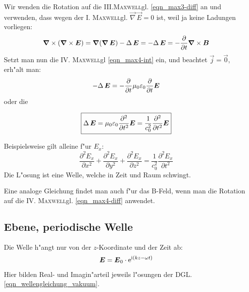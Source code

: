 Wir wenden die Rotation auf die
III.\textsc{Maxwell}gl. \eqref{eqn_max3-diff} an und verwenden, dass
wegen der I. \textsc{Maxwell}gl. $\vec\nabla\, \vec E = 0$ ist, weil
ja keine Ladungen vorliegen:
\begin{equation}
   \label{eq:401}
   \boldsymbol{\nabla}\times (\boldsymbol{\nabla}\times \boldsymbol{E}) =
\boldsymbol{\nabla}(\boldsymbol{\nabla}\, \boldsymbol{E}) - \Delta \,{\boldsymbol{E}} = -\Delta \,{\boldsymbol{E}}
=
-\frac{\partial }{\partial t} \boldsymbol{\nabla}\times \boldsymbol{B}
\end{equation}
Setzt man nun die IV. \textsc{Maxwell}gl \eqref{eqn_max4-int} ein,
und beachtet $\vec j = \vec 0$, erh"alt man:
\begin{equation*}
   \label{eq:402}
   -\Delta \, \boldsymbol{E} = -\frac{\partial }{\partial t} \mu_0\varepsilon_0
   \frac{\partial }{\partial t} \boldsymbol{E}
\end{equation*}
oder die
\begin{Wichtig}
\begin{equation}
   \label{eqn_wellengleichung_vakuum}
   \boxed{ \Delta \, \boldsymbol{E} = \mu_0\varepsilon_0 \frac{\partial^2
     }{\partial t^2} \boldsymbol{E} = \frac{1}{c_0^2} \frac{\partial
       ^2}{\partial t^2}\boldsymbol{E}}
\end{equation}
\end{Wichtig}

Beispielsweise gilt alleine f"ur $E_x$:
\begin{equation*}
   \frac{\partial^2 E_x}{\partial x^2}
+    \frac{\partial^2 E_x}{\partial y^2}
+    \frac{\partial^2 E_x}{\partial z^2}
=
\frac{1}{c_0^2} \frac{\partial ^2 E_x}{\partial t^2}
\end{equation*}
Die L"osung ist eine Welle, welche in Zeit und Raum schwingt.

Eine analoge Gleichung findet man auch f"ur das B-Feld, wenn man die
Rotation auf die IV. \textsc{Maxwell}gl. \eqref{eqn_max4-diff} anwendet.





\subsection{Ebene, periodische Welle}
\label{kap_ebene-periodische-welle}

Die Welle h"angt nur von der $z$-Koordinate und der Zeit ab:
\begin{equation}
   \label{eq:404}
   \boldsymbol{E} = \boldsymbol{E}_0 \cdot \operatorname{e}^{\operatorname{i}(kz - \omega t)}
\end{equation}
Hier bilden Real- und Imagin"arteil jeweils l"osungen der
DGL. \eqref{eqn_wellengleichung_vakuum}.

